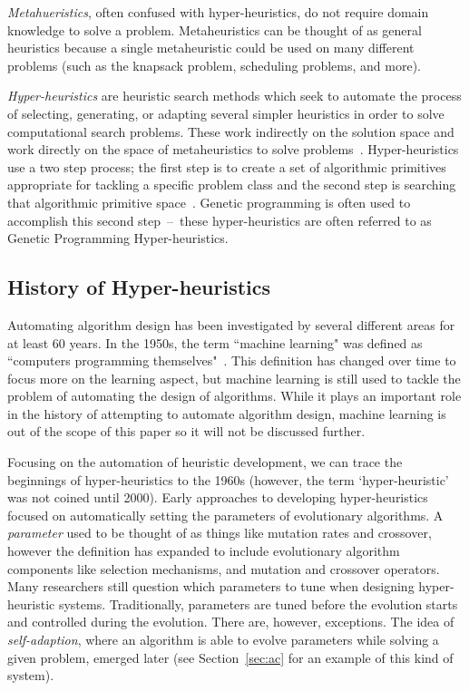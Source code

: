\documentclass{sig-alternate}
\begin{document}
\textit{Metahueristics}, often confused with hyper-heuristics, do not require domain knowledge to solve a problem. Metaheuristics can be thought of as general heuristics because a single metaheuristic could be used on many different problems (such as the knapsack problem, scheduling problems, and more).~\cite{tauritz:tutorial}

\textit{Hyper-heuristics} are heuristic search methods which seek to automate the process of selecting, generating, or adapting several simpler heuristics in order to solve computational search problems. These work indirectly on the solution space and work directly on the space of metaheuristics to solve problems~\cite{tauritz:tutorial}. Hyper-heuristics use a two step process; the first step is to create a set of algorithmic primitives appropriate for tackling a specific problem class and the second step is searching that algorithmic primitive space~\cite{harris:2015}. Genetic programming is often used to accomplish this second step~--~these hyper-heuristics are often referred to as Genetic Programming Hyper-heuristics.

\subsection{History of Hyper-heuristics}
\label{sec:history}
Automating algorithm design has been investigated by several different areas for at least 60 years. In the 1950s, the term ``machine learning" was defined as ``computers programming themselves"~\cite{pappa:2014}. This definition has changed over time to focus more on the learning aspect, but machine learning is still used to tackle the problem of automating the design of algorithms. While it plays an important role in the history of attempting to automate algorithm design, machine learning is out of the scope of this paper so it will not be discussed further.

Focusing on the automation of heuristic development, we can trace the beginnings of hyper-heuristics to the 1960s (however, the term `hyper-heuristic' was not coined until 2000). Early approaches to developing hyper-heuristics focused on automatically setting the parameters of evolutionary algorithms. A \textit{parameter} used to be thought of as things like mutation rates and crossover, however the definition has expanded to include evolutionary algorithm components like selection mechanisms, and mutation and crossover operators. Many researchers still question which parameters to tune when designing hyper-heuristic systems. Traditionally, parameters are tuned before the evolution starts and controlled during the evolution. There are, however, exceptions. The idea of \textit{self-adaption}, where an algorithm is able to evolve parameters while solving a given problem, emerged later (see Section~\ref{sec:ac} for an example of this kind of system).~\cite{pappa:2014}
\end{document}
